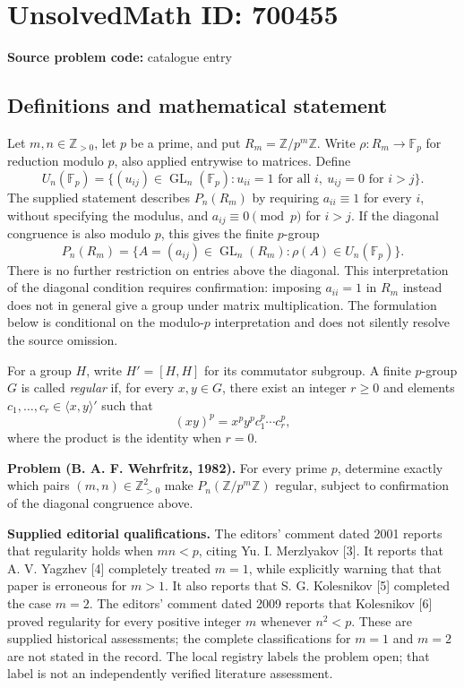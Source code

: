 \documentclass[11pt]{article}
\newcommand{\Z}{\mathbb{Z}}
\newcommand{\F}{\mathbb{F}}
\begin{document}
\section*{UnsolvedMath ID: 700455}
\textbf{Source problem code:} catalogue entry
\subsection{Definitions and mathematical statement}
Let \(m,n\in\Z_{>0}\), let \(p\) be a prime, and put \(R_m=\Z/p^m\Z\). Write \(\rho:R_m\to\F_p\) for reduction modulo \(p\), also applied entrywise to matrices. Define
\[
U_n(\F_p)=\{(u_{ij})\in\operatorname{GL}_n(\F_p):u_{ii}=1\text{ for all }i,\ u_{ij}=0\text{ for }i>j\}.
\]
The supplied statement describes \(P_n(R_m)\) by requiring \(a_{ii}\equiv1\) for every \(i\), without specifying the modulus, and \(a_{ij}\equiv0\pmod p\) for \(i>j\). If the diagonal congruence is also modulo \(p\), this gives the finite \(p\)-group
\[
P_n(R_m)=\{A=(a_{ij})\in\operatorname{GL}_n(R_m):\rho(A)\in U_n(\F_p)\}.
\]
There is no further restriction on entries above the diagonal. This interpretation of the diagonal condition requires confirmation: imposing \(a_{ii}=1\) in \(R_m\) instead does not in general give a group under matrix multiplication. The formulation below is conditional on the modulo-\(p\) interpretation and does not silently resolve the source omission.

For a group \(H\), write \(H'=[H,H]\) for its commutator subgroup. A finite \(p\)-group \(G\) is called \emph{regular} if, for every \(x,y\in G\), there exist an integer \(r\geq0\) and elements \(c_1,\ldots,c_r\in\langle x,y\rangle'\) such that
\[
(xy)^p=x^py^p c_1^p\cdots c_r^p,
\]
where the product is the identity when \(r=0\).

\textbf{Problem (B. A. F. Wehrfritz, 1982).} For every prime \(p\), determine exactly which pairs \((m,n)\in\Z_{>0}^2\) make \(P_n(\Z/p^m\Z)\) regular, subject to confirmation of the diagonal congruence above.

\textbf{Supplied editorial qualifications.} The editors' comment dated 2001 reports that regularity holds when \(mn<p\), citing Yu. I. Merzlyakov [3]. It reports that A. V. Yagzhev [4] completely treated \(m=1\), while explicitly warning that that paper is erroneous for \(m>1\). It also reports that S. G. Kolesnikov [5] completed the case \(m=2\). The editors' comment dated 2009 reports that Kolesnikov [6] proved regularity for every positive integer \(m\) whenever \(n^2<p\). These are supplied historical assessments; the complete classifications for \(m=1\) and \(m=2\) are not stated in the record. The local registry labels the problem open; that label is not an independently verified literature assessment.
\end{document}

